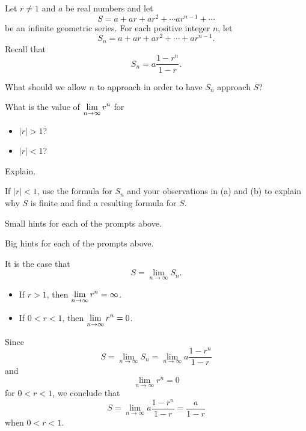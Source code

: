 \begin{activity} \label{8.2.Act2} Let $r \ne 1$ and $a$ be real numbers and let
\[S = a+ar+ar^2 + \cdots ar^{n-1} + \cdots \]
be an infinite geometric series. For each positive integer $n$, let
\[S_n = a+ar+ar^2 + \cdots + ar^{n-1}.\]
Recall that
\[S_n = a\frac{1-r^n}{1-r}.\]
\ba
\item What should we allow $n$ to approach in order to have $S_n$ approach $S$?

\item What is the value of  $\displaystyle \lim_{n \to \infty} r^n$ for
\begin{itemize}
\item $|r| > 1$?
\item $|r| < 1$?
\end{itemize}
Explain.



\item If $|r| < 1$, use the formula for $S_n$ and your observations in (a) and (b) to explain why $S$ is finite and find a resulting formula for $S$.



\ea
\end{activity}

\begin{smallhint}
\ba
	\item Small hints for each of the prompts above.
\ea
\end{smallhint}
\begin{bighint}
\ba
	\item Big hints for each of the prompts above.
\ea
\end{bighint}
\begin{activitySolution}
\ba
	\item It is the case that
\[S = \lim_{n \to \infty} S_n.\]
    \item 
\begin{itemize}
\item If $r > 1$, then $\displaystyle \lim_{n \to \infty} r^n = \infty$.
\item If $0 < r < 1$, then $\displaystyle \lim_{n \to \infty} r^n = 0$.
\end{itemize}
    \item Since
\[S = \lim_{n \to \infty} S_n = \lim_{n \to \infty} a\frac{1-r^n}{1-r}\]
and
\[\lim_{n \to \infty} r^n = 0\]
for $0 < r < 1$, we conclude that
\[S = \lim_{n \to \infty} a\frac{1-r^n}{1-r} = \frac{a}{1-r}\]
when $0 < r < 1$.


\ea
\end{activitySolution}
\aftera 